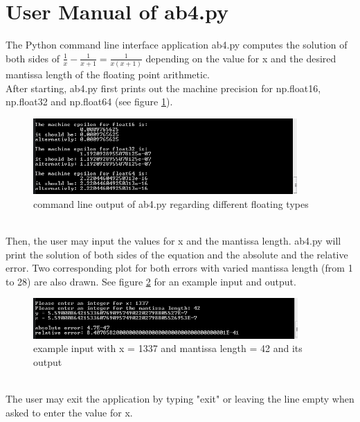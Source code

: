 \section{User Manual of ab4.py}
The Python command line interface application ab4.py computes the solution of both sides of \(\frac{1}{x} - \frac{1}{x + 1} = \frac{1}{x (x + 1)}\) depending on the value for x and the desired mantissa length of the floating point arithmetic. \\
After starting, ab4.py first prints out the machine precision for np.float16, np.float32 and np.float64 (see figure \ref{fig:cmd_epsilon}).
\begin{figure}[h]
    \centering
        \includegraphics[width=0.9\textwidth]{graphics/cmd_epsilon}
    \caption{command line output of ab4.py regarding different floating types}\label{fig:cmd_epsilon}
\end{figure}\\
Then, the user may input the values for x and the mantissa length. ab4.py will print the solution of both sides of the equation and the absolute and the relative error. Two corresponding plot for both errors with varied mantissa length (from 1 to 28) are also drawn. See figure \ref{fig:cmd_example} for an example input and output.
\begin{figure}[h]
    \centering
        \includegraphics[width=0.9\textwidth]{graphics/cmd_example}
    \caption{example input with x = 1337 and mantissa length = 42 and its output}\label{fig:cmd_example}
\end{figure}\\
The user may exit the application by typing "exit" or leaving the line empty when asked to enter the value for x.